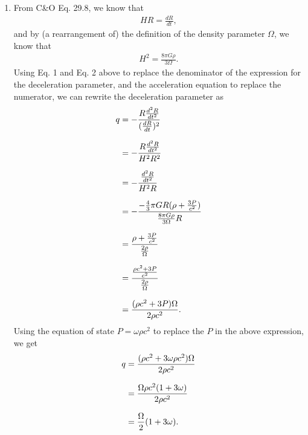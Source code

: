 \documentclass[11pt,letterpaper]{article}
\begin{document}
\begin{enumerate}[label=(\roman*)]
    \item From C\&O Eq. 29.8, we know that 
        \begin{align}
            HR = \frac{dR}{dt},
        \end{align}
        and by (a rearrangement of) the definition of the density parameter $\Omega$, we know that 
        \begin{align}
            H^2 = \frac{8\pi G\rho}{3\Omega}.
        \end{align}
        Using Eq. 1 and Eq. 2 above to replace the denominator of the expression for the deceleration parameter, and the acceleration equation to replace the numerator, we can rewrite the deceleration parameter as 
        \begin{equation*}
        \setlength{\jot}{10pt}
            \begin{align*}
                q &= -\frac{R\frac{d^2R}{dt^2}}{(\frac{dR}{dt})^2} \\
                &= -\frac{R\frac{d^2R}{dt^2}}{H^2R^2} \\
                &= -\frac{\frac{d^2R}{dt^2}}{H^2R} \\
                &= -\frac{-\frac{4}{3}\pi GR(\rho + \frac{3P}{c^2})}{\frac{8\pi G\rho}{3\Omega}R} \\
                &= \frac{\rho + \frac{3P}{c^2}}{\frac{2\rho}{\Omega}} \\
                &= \frac{\frac{\rho c^2 + 3P}{c^2}}{\frac{2\rho}{\Omega}} \\
                &= \frac{(\rho c^2 + 3P)\Omega}{2\rho c^2}.
            \end{align*}
        \end{equation*}
        Using the equation of state $P=\omega \rho c^2$ to replace the $P$ in the above expression, we get 
        \begin{equation*}
        \setlength{\jot}{10pt}
            \begin{align*}
                q &= \frac{(\rho c^2 + 3\omega \rho c^2)\Omega}{2\rho c^2} \\
                &= \frac{\Omega\rho c^2(1+3\omega)}{2\rho c^2} \\
                &= \frac{\Omega}{2}(1+3\omega). 
            \end{align*}
        \end{equation*}


\end{enumerate}
\end{document}
